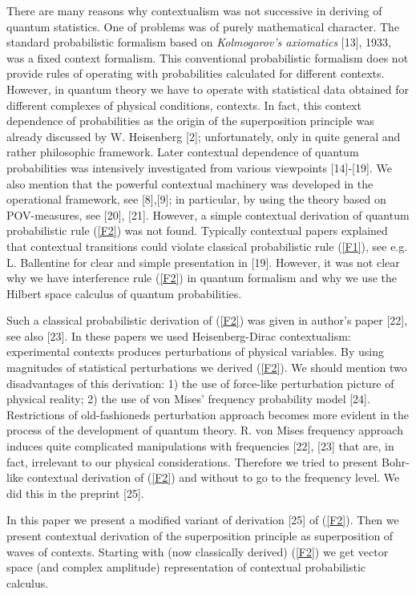 \documentclass[12pt,oneside,final,a4paper]{article}
\begin{document}
There are many reasons why contextualism was not successive in deriving of 
quantum statistics. One of problems was of purely mathematical character. The standard 
probabilistic formalism based on {\it Kolmogorov's axiomatics} [13], 1933, was a fixed context
formalism. This conventional probabilistic formalism  does not provide rules of operating 
with probabilities calculated for different contexts. However, in quantum theory we have to
operate with statistical data obtained for different complexes of physical conditions,
contexts. In fact, this context dependence of probabilities as the origin of the superposition
principle was already discussed by W. Heisenberg [2]; unfortunately, only in quite general
and rather philosophic framework. Later contextual dependence of quantum probabilities
was intensively investigated from various viewpoints [14]-[19]. We also mention that the powerful contextual
machinery was developed in the operational framework, see [8],[9];
in particular, by using the theory based on POV-measures, see [20], [21]. However, a simple contextual
derivation of quantum probabilistic rule (\ref{F2}) was not found. Typically contextual papers
explained that contextual transitions could violate classical probabilistic
rule (\ref{F1}), see e.g. L. Ballentine for clear and simple presentation in [19].
However, it was not clear why we have interference rule (\ref{F2}) in quantum formalism
and why we use the Hilbert space calculus of quantum probabilities.

Such a classical probabilistic derivation of (\ref{F2}) was given in author's paper [22],
see also [23]. In these papers we used Heisenberg-Dirac contextualism: experimental contexts
produces perturbations of physical variables. By using magnitudes of statistical perturbations
we derived (\ref{F2}). We should mention two disadvantages of this derivation:
1) the use of force-like perturbation picture of physical reality; 2) the use of von Mises'
frequency probability model [24]. Restrictions of old-fashioneds perturbation approach
becomes more evident in the process of the development of quantum theory. R. von Mises frequency
approach induces quite complicated manipulations with frequencies [22], [23] that are, in fact, irrelevant
to our physical considerations. Therefore we tried to present Bohr-like contextual derivation
of (\ref{F2}) and without to go to the frequency level. We did this in the preprint [25].

In this paper we present a modified variant of derivation [25] of (\ref{F2}). Then we 
present contextual derivation of the superposition principle as superposition of waves 
of contexts. Starting with (now classically derived) (\ref{F2}) we get vector space (and complex amplitude)
representation of contextual probabilistic calculus.
\end{document}

